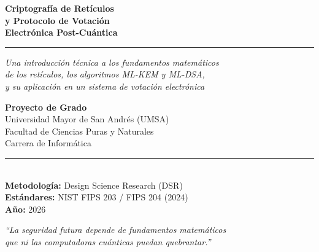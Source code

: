 \documentclass[12pt,a4paper,twoside,openright]{book}
\theoremstyle{plain}
\theoremstyle{definition}
\theoremstyle{remark}
\newcommand{\MLKEM}{\textsf{ML-KEM}}
\newcommand{\MLDSA}{\textsf{ML-DSA}}
\begin{document}

\begin{titlepage}
\centering
\vspace*{1cm}
{\huge\bfseries\color{PQCBlue}
  Criptograf\'ia de Ret\'iculos\\[0.4em]
  y Protocolo de Votaci\'on\\[0.4em]
  Electr\'onica Post-Cu\'antica
\par}
\vspace{0.5cm}
\rule{\linewidth}{0.5mm}
\vspace{0.8cm}

{\Large\itshape
  Una introducci\'on t\'ecnica a los fundamentos matem\'aticos\\
  de los ret\'iculos, los algoritmos \MLKEM{} y \MLDSA{},\\
  y su aplicaci\'on en un sistema de votaci\'on electr\'onica
\par}
\vspace{1.2cm}

{\large\bfseries Proyecto de Grado}\\[0.3em]
{\large Universidad Mayor de San Andr\'es (UMSA)}\\[0.2em]
{\large Facultad de Ciencias Puras y Naturales}\\[0.2em]
{\large Carrera de Inform\'atica}\\[0.8em]

\rule{0.6\linewidth}{0.3mm}\\[0.5em]
{\large\textbf{Metodolog\'ia:} Design Science Research (DSR)}\\[0.2em]
{\large\textbf{Est\'andares:} NIST FIPS 203 / FIPS 204 (2024)}\\[0.2em]
{\large\textbf{A\~no:} 2026}

\vfill
{\small\color{PQCGray}
  \textit{``La seguridad futura depende de fundamentos matem\'aticos\\
  que ni las computadoras cu\'anticas puedan quebrantar.''}
}
\end{titlepage}

\frontmatter
\tableofcontents
\listoftables

\end{document}
